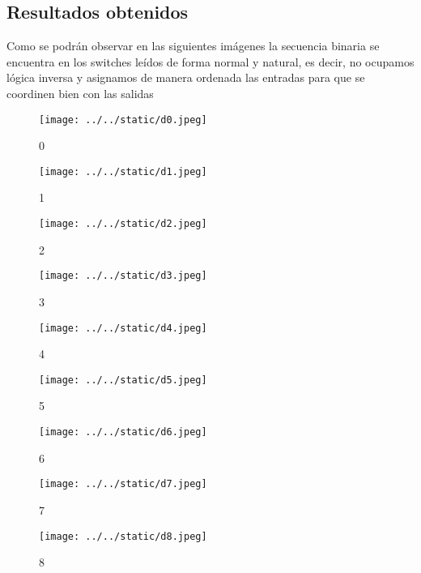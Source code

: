\documentclass{article}
\begin{document}
\begin{multicols}{2}
\section{Resultados obtenidos}\label{sec:resObtenidos}
Como se podrán observar en las siguientes imágenes la secuencia binaria se encuentra en los switches leídos de forma normal y natural, es decir, no ocupamos lógica inversa y asignamos de manera ordenada las entradas para que se coordinen bien con las salidas 
\begin{figure}[H]
	\centering
	\texttt{[image: ../../static/d0.jpeg]}	
	\caption{0}
	\label{fig:3}
\end{figure}

\begin{figure}[H]
	\centering
	\texttt{[image: ../../static/d1.jpeg]}	
	\caption{1}
	\label{fig:4}
\end{figure}

\begin{figure}[H]
	\centering
	\texttt{[image: ../../static/d2.jpeg]}	
	\caption{2}
	\label{fig:5}
\end{figure}

\begin{figure}[H]
	\centering
	\texttt{[image: ../../static/d3.jpeg]}	
	\caption{3}
	\label{fig:6}
\end{figure}

\begin{figure}[H]
	\centering
	\texttt{[image: ../../static/d4.jpeg]}	
	\caption{4}
	\label{fig:7}
\end{figure}

\begin{figure}[H]
	\centering
	\texttt{[image: ../../static/d5.jpeg]}	
	\caption{5}
	\label{fig:8}
\end{figure}

\begin{figure}[H]
	\centering
	\texttt{[image: ../../static/d6.jpeg]}	
	\caption{6}
	\label{fig:9}
\end{figure}

\begin{figure}[H]
	\centering
	\texttt{[image: ../../static/d7.jpeg]}	
	\caption{7}
	\label{fig:10}
\end{figure}

\begin{figure}[H]
	\centering
	\texttt{[image: ../../static/d8.jpeg]}	
	\caption{8}
	\label{fig:11}
\end{figure}


\end{multicols}
\end{document}
